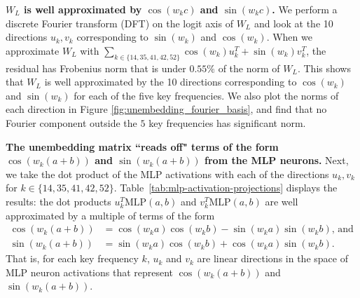 \documentclass{article} %
\newcommand{\cosp}[1]{\cos \left ( #1 \right )}
\newcommand{\sinp}[1]{\sin \left ( #1 \right )}
\newcommand{\keyfreqs}{\{14, 35, 41, 42, 52\}}
\newcommand{\MLP}{\textrm{MLP}}
\begin{document}

\textbf{$W_L$ is well approximated by $\cosp{w_k c}$ and $\sinp{w_k c}$.}   %
We perform a discrete Fourier transform (DFT) on the logit axis of $W_L$ and look at the 10 directions $u_k, v_k$ corresponding to $\sinp{w_k}$ and $\cosp{w_k}$.  When we approximate $W_L$ with ${\sum}_{k \in \keyfreqs} \cosp{w_k} u_k^T + \sinp{w_k} v_k ^T$, the residual has Frobenius norm that is under $0.55\%$ of the norm of $W_L$. This shows that $W_L$ is well approximated by the 10 directions corresponding to $\cosp{w_k}$ and $\sinp{w_k}$ for each of the five key frequencies. We also plot the norms of each direction in Figure \ref{fig:unembedding_fourier_basis}, and find that no Fourier component outside the $5$ key frequencies has significant norm. 


\textbf{The unembedding matrix ``reads off" terms of the form $\cosp{w_k(a+b)}$ and $\sinp{w_k (a+b)}$ from the MLP neurons.} 
Next, we take the dot product of the MLP activations with each of the directions $u_k, v_k$ for $k \in \keyfreqs$. Table~\ref{tab:mlp-activation-projections} displays the results: the dot products $u_k^T \MLP(a,b)$ and $v_k^T \MLP(a,b)$ are well approximated by a multiple of terms of the form
\begin{align*}
\cosp{w_k(a+b)} &= \cosp{w_k a} \cosp{w_k b} - \sinp{w_k a}\sinp{w_k b} \textrm{, and }\\
\sinp{w_k(a+b)} &= \sinp{w_k a}\cosp{w_k b} + \cosp{w_k a} \sinp{w_k b} .
\end{align*}
That is, for each key frequency $k$, $u_k$ and $v_k$ are linear directions in the space of MLP neuron activations that represent $\cosp{w_k(a+b)}$ and $\sinp{w_k(a+b)}$. 
\end{document}
